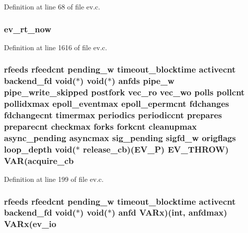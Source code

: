 \-Definition at line 68 of file ev.\-c.

\hypertarget{structev__loop_a775f0f0bd69e3d84a7804b2db59494df}{
\subsubsection[{ev\-\_\-rt\-\_\-now}]{ {\bf ev\-\_\-rt\-\_\-now}}}\label{structev__loop_a775f0f0bd69e3d84a7804b2db59494df}


\-Definition at line 1616 of file ev.\-c.

\hypertarget{structev__loop_a702d520e97528376a5500c86e6c324ef}{
\subsubsection[{release\-\_\-cb}]{ {\bf rfeeds} {\bf rfeedcnt} {\bf pending\-\_\-w} {\bf timeout\-\_\-blocktime} {\bf activecnt} {\bf backend\-\_\-fd} void($\ast$) void($\ast$) {\bf anfds} {\bf pipe\-\_\-w} {\bf pipe\-\_\-write\-\_\-skipped} {\bf postfork} {\bf vec\-\_\-ro} {\bf vec\-\_\-wo} {\bf polls} {\bf pollcnt} {\bf pollidxmax} {\bf epoll\-\_\-eventmax} {\bf epoll\-\_\-epermcnt} {\bf fdchanges} {\bf fdchangecnt} {\bf timermax} {\bf periodics} {\bf periodiccnt} {\bf prepares} {\bf preparecnt} {\bf checkmax} {\bf forks} {\bf forkcnt} {\bf cleanupmax} {\bf async\-\_\-pending} {\bf asyncmax} {\bf sig\-\_\-pending} {\bf sigfd\-\_\-w} {\bf origflags} {\bf loop\-\_\-depth} void($\ast$ {\bf release\-\_\-cb})({\bf \-E\-V\-\_\-\-P}) {\bf \-E\-V\-\_\-\-T\-H\-R\-O\-W}) {\bf \-V\-A\-R}({\bf acquire\-\_\-cb}}}\label{structev__loop_a702d520e97528376a5500c86e6c324ef}


\-Definition at line 199 of file ev.\-c.

\hypertarget{structev__loop_ab4710db67bbb58f2502416b96745b404}{
\subsubsection[{\-V\-A\-Rx}]{ {\bf rfeeds} {\bf rfeedcnt} {\bf pending\-\_\-w} {\bf timeout\-\_\-blocktime} {\bf activecnt} {\bf backend\-\_\-fd} void($\ast$) void($\ast$) anfd {\bf \-V\-A\-Rx})(int, {\bf anfdmax}) {\bf \-V\-A\-Rx}({\bf ev\-\_\-io}}}\label{structev__loop_ab4710db67bbb58f2502416b96745b404}


